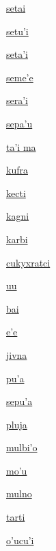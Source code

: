 {\hyperlink{val:setai}{setai}}{}{}{}

{\hyperlink{val:setuhi}{setu'i}}{}{}{}

{\hyperlink{val:setahi}{seta'i}}{}{}{}

{\hyperlink{val:semehe}{seme'e}}{}{}{}

{\hyperlink{val:serahi}{sera'i}}{}{}{}

{\hyperlink{val:sepahu}{sepa'u}}{}{}{}

{\hyperlink{val:tahi ma}{ta'i ma}}{}{}{}

{\hyperlink{val:kufra}{kufra}}{}{}{}

{\hyperlink{val:kecti}{kecti}}{}{}{}

{\hyperlink{val:kagni}{kagni}}{}{}{}

{\hyperlink{val:karbi}{karbi}}{}{}{}

{\hyperlink{val:cukyxratci}{cukyxratci}}{}{}{}

{\hyperlink{val:uu}{uu}}{}{}{}

{\hyperlink{val:bai}{bai}}{}{}{}

{\hyperlink{val:ehe}{e'e}}{}{}{}

{\hyperlink{val:jivna}{jivna}}{}{}{}

{\hyperlink{val:puha}{pu'a}}{}{}{}

{\hyperlink{val:sepuha}{sepu'a}}{}{}{}

{\hyperlink{val:pluja}{pluja}}{}{}{}

{\hyperlink{val:mulbiho}{mulbi'o}}{}{}{}

{\hyperlink{val:mohu}{mo'u}}{}{}{}

{\hyperlink{val:mulno}{mulno}}{}{}{}

{\hyperlink{val:tarti}{tarti}}{}{}{}

{\hyperlink{val:ohucuhi}{o'ucu'i}}{}{}{}

